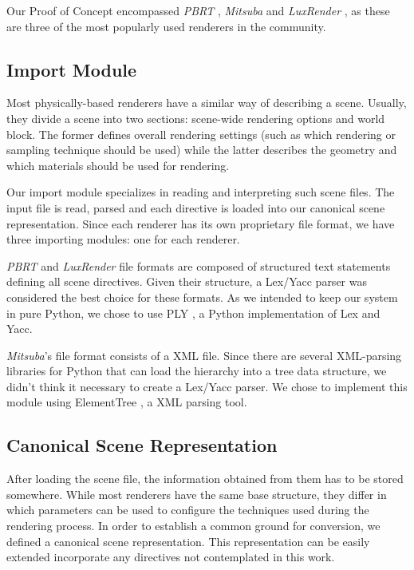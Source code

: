 \documentclass[10pt,conference]{IEEEtran}
\begin{document}
Our Proof of Concept encompassed \textit{PBRT} \cite{pbrt}, \textit{Mitsuba} 
\cite{mitsuba} and \textit{LuxRender} \cite{luxrender}, as these are three of 
the most popularly used renderers in the community.

\subsection{Import Module}
Most physically-based renderers have a similar way of describing a scene. 
Usually, they divide a scene into two sections: scene-wide rendering options and 
world block. The former defines overall rendering settings (such as which 
rendering or sampling technique should be used) while the latter describes the 
geometry and which materials should be used for rendering.

Our import module specializes in reading and interpreting such scene files. The 
input file is read, parsed and each directive is loaded into our canonical scene 
representation. Since each renderer has its own proprietary file format, we have 
three importing modules: one for each renderer.

\textit{PBRT} and \textit{LuxRender} file formats are composed of structured 
text statements defining all scene directives. Given their structure, a Lex/Yacc 
parser was considered the best choice for these formats. As we intended to keep 
our system in pure Python, we chose to use PLY \cite{ply}, a Python 
implementation of Lex and Yacc.

\textit{Mitsuba}'s file format consists of a XML file. Since there are several 
XML-parsing libraries for Python that can load the hierarchy into a tree data 
structure, we didn't think it necessary to create a Lex/Yacc parser. We chose to 
implement this module using ElementTree \cite{ET}, a XML parsing tool.

\subsection{Canonical Scene Representation}
After loading the scene file, the information obtained from them has to be 
stored somewhere. While most renderers have the same base structure, they differ 
in which parameters can be used to configure the techniques used during the 
rendering process. In order to establish a common ground for conversion, we 
defined a canonical scene representation. This representation can be easily 
extended incorporate any directives not contemplated in this work.
\end{document}
